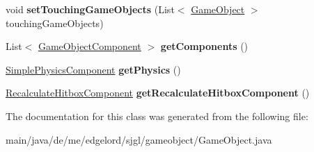 \begin{DoxyCompactItemize}
\item 
\mbox{\label{classde_1_1me_1_1edgelord_1_1sjgl_1_1gameobject_1_1_game_object_a3433057c07896876674379d74c629a8e}} 
void {\bfseries set\+Touching\+Game\+Objects} (List$<$ \mbox{\hyperlink{classde_1_1me_1_1edgelord_1_1sjgl_1_1gameobject_1_1_game_object}{Game\+Object}} $>$ touching\+Game\+Objects)
\item 
\mbox{\label{classde_1_1me_1_1edgelord_1_1sjgl_1_1gameobject_1_1_game_object_a5b74e6a06d850004b4a153b1d5838c53}} 
List$<$ \mbox{\hyperlink{classde_1_1me_1_1edgelord_1_1sjgl_1_1gameobject_1_1_game_object_component}{Game\+Object\+Component}} $>$ {\bfseries get\+Components} ()
\item 
\mbox{\label{classde_1_1me_1_1edgelord_1_1sjgl_1_1gameobject_1_1_game_object_ac943a6d1be86e4381333cd0f7237353d}} 
\mbox{\hyperlink{classde_1_1me_1_1edgelord_1_1sjgl_1_1gameobject_1_1components_1_1_simple_physics_component}{Simple\+Physics\+Component}} {\bfseries get\+Physics} ()
\item 
\mbox{\label{classde_1_1me_1_1edgelord_1_1sjgl_1_1gameobject_1_1_game_object_a7b7d822e981cedc42e979041e70d9cd5}} 
\mbox{\hyperlink{classde_1_1me_1_1edgelord_1_1sjgl_1_1gameobject_1_1components_1_1_recalculate_hitbox_component}{Recalculate\+Hitbox\+Component}} {\bfseries get\+Recalculate\+Hitbox\+Component} ()
\end{DoxyCompactItemize}


The documentation for this class was generated from the following file\+:\begin{DoxyCompactItemize}
\item 
main/java/de/me/edgelord/sjgl/gameobject/Game\+Object.\+java\end{DoxyCompactItemize}
